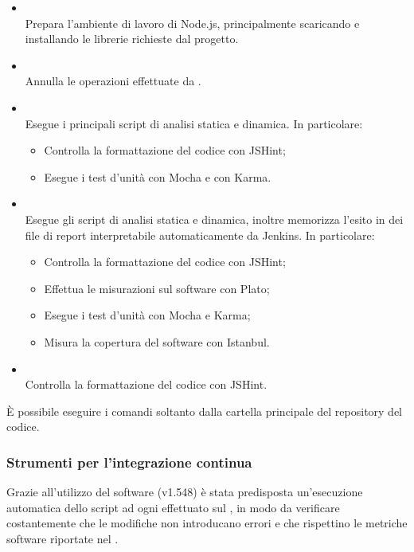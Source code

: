 \begin{itemize}
	\item \textbf{} \\
	Prepara l'ambiente di lavoro di Node.js, principalmente scaricando e installando le librerie richieste dal progetto.
		
	\item \textbf{} \\
	Annulla le operazioni effettuate da .

	\item \textbf{} \\
	Esegue i principali script di analisi statica e dinamica. In particolare:
	\begin{itemize}
	\item Controlla la formattazione del codice con JSHint;
	\item Esegue i test d'unità con Mocha e con Karma.
	\end{itemize}

	\item \textbf{} \\
	Esegue gli script di analisi statica e dinamica, inoltre memorizza l'esito in dei file di report interpretabile automaticamente da Jenkins. In particolare:
	\begin{itemize}
	\item Controlla la formattazione del codice con JSHint;
	\item Effettua le misurazioni sul software con Plato;
	\item Esegue i test d'unità con Mocha e Karma;
	\item Misura la copertura del software con Istanbul.
	\end{itemize}

	\item \textbf{} \\
	Controlla la formattazione del codice con JSHint.
\end{itemize}

È possibile eseguire i comandi soltanto dalla cartella principale del repository del codice.

	\subsubsection{Strumenti per l'integrazione continua}
	\label{jenkins}
	
	Grazie all'utilizzo del software \textbf{} (v1.548) è stata predisposta un'esecuzione automatica dello script  ad ogni  effettuato sul , in modo da verificare costantemente che le modifiche non introducano errori e che rispettino le metriche software riportate nel \PianoDiQualifica{}.
	
